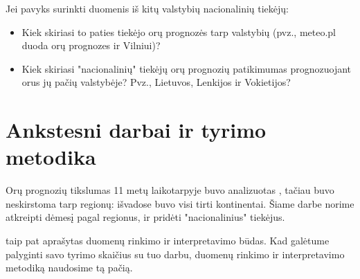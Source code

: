 \documentclass{article}
\begin{document}
Jei pavyks surinkti duomenis iš kitų valstybių nacionalinių tiekėjų:
\begin{itemize}
    \item Kiek skiriasi to paties tiekėjo orų prognozės tarp valstybių (pvz.,
        meteo.pl duoda orų prognozes ir Vilniui)?
    \item Kiek skiriasi "nacionalinių" tiekėjų orų prognozių patikimumas
        prognozuojant orus jų pačių valstybėje? Pvz., Lietuvos, Lenkijos ir
        Vokietijos?
\end{itemize}

\section{Ankstesni darbai ir tyrimo metodika}

Orų prognozių tikslumas 11 metų laikotarpyje buvo analizuotas
\cite{rose2017analysis}, tačiau buvo neskirstoma tarp regionų: išvadose buvo
visi tirti kontinentai. Šiame darbe norime atkreipti dėmesį pagal regionus, ir
pridėti "nacionalinius" tiekėjus.

\cite{rose2017analysis} taip pat aprašytas duomenų rinkimo ir interpretavimo
būdas. Kad galėtume palyginti savo tyrimo skaičius su tuo darbu, duomenų
rinkimo ir interpretavimo metodiką naudosime tą pačią.

\printbibliography
\end{document}
